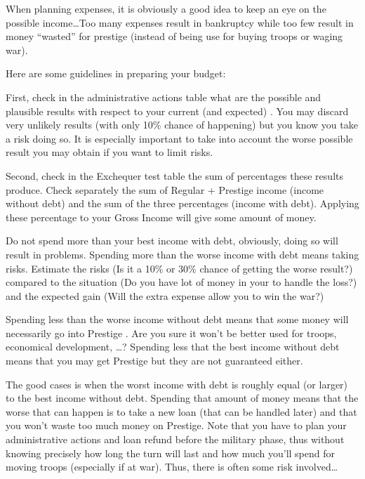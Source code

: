 \begin{playtip}
  When planning expenses, it is obviously a good idea to keep an eye on the
  possible income\ldots Too many expenses result in bankruptcy while too few
  result in money ``wasted'' for prestige (instead of being use for buying
  troops or waging war).

  Here are some guidelines in preparing your budget:
  
  First, check in the administrative actions table what are the possible and
  plausible results with respect to your current (and expected) \STAB. You may
  discard very unlikely results (with only 10\% chance of happening) but you
  know you take a risk doing so. It is especially important to take into
  account the worse possible result you may obtain if you want to limit risks.

  Second, check in the Exchequer test table the sum of percentages these
  results produce. Check separately the sum of Regular + Prestige income
  (income without debt) and the sum of the three percentages (income with
  debt). Applying these percentage to your Gross Income will give some amount
  of money.

  Do not spend more than your best income with debt, obviously, doing so
  will result in problems. Spending more than the worse income with debt means
  taking risks. Estimate the risks (Is it a 10\% or 30\% chance of getting the
  worse result?) compared to the situation (Do you have lot of money in your
  \RT to handle the loss?) and the expected gain (Will the extra expense allow
  you to win the war?)

  Spending less than the worse income without debt means that some money will
  necessarily go into Prestige \VPs. Are you sure it won't be better used for
  troops, economical development, \ldots? Spending less that the best income
  without debt means that you may get Prestige \VPs but they are not
  guaranteed either.

  The good cases is when the worst income with debt is roughly equal (or
  larger) to the best income without debt. Spending that amount of money means
  that the worse that can happen is to take a new loan (that can be handled
  later) and that you won't waste too much money on Prestige. Note that you
  have to plan your administrative actions and loan refund before the military
  phase, thus without knowing precisely how long the turn will last and how
  much you'll spend for moving troops (especially if at war). Thus, there is
  often some risk involved\ldots


\end{playtip}
